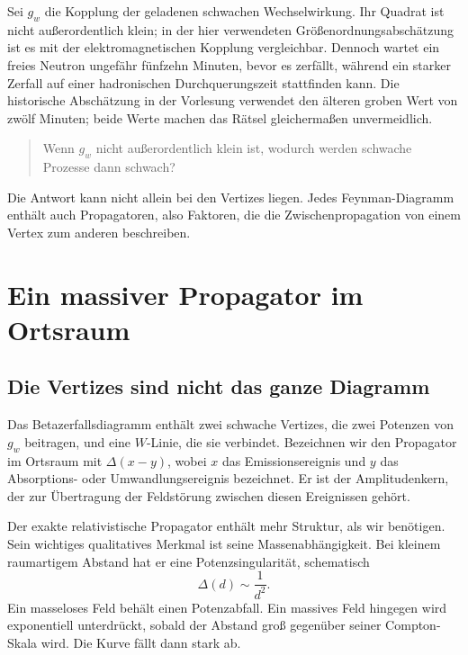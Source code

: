 Sei \(g_w\) die Kopplung der geladenen schwachen Wechselwirkung. Ihr Quadrat ist nicht außerordentlich klein; in der hier verwendeten Größenordnungsabschätzung ist es mit der elektromagnetischen Kopplung vergleichbar. Dennoch wartet ein freies Neutron ungefähr fünfzehn Minuten, bevor es zerfällt, während ein starker Zerfall auf einer hadronischen Durchquerungszeit stattfinden kann. Die historische Abschätzung in der Vorlesung verwendet den älteren groben Wert von zwölf Minuten; beide Werte machen das Rätsel gleichermaßen unvermeidlich.
\begin{quote}
Wenn \(g_w\) nicht außerordentlich klein ist, wodurch werden schwache Prozesse dann schwach?
\end{quote}

Die Antwort kann nicht allein bei den Vertizes liegen. Jedes Feynman-Diagramm enthält auch Propagatoren, also Faktoren, die die Zwischenpropagation von einem Vertex zum anderen beschreiben.

\section{Ein massiver Propagator im Ortsraum}

\subsection{Die Vertizes sind nicht das ganze Diagramm}

Das Betazerfallsdiagramm enthält zwei schwache Vertizes, die zwei Potenzen von \(g_w\) beitragen, und eine \(W\)-Linie, die sie verbindet. Bezeichnen wir den Propagator im Ortsraum mit \(\Delta(x-y)\), wobei \(x\) das Emissionsereignis und \(y\) das Absorptions- oder Umwandlungsereignis bezeichnet. Er ist der Amplitudenkern, der zur Übertragung der Feldstörung zwischen diesen Ereignissen gehört.

Der exakte relativistische Propagator enthält mehr Struktur, als wir benötigen. Sein wichtiges qualitatives Merkmal ist seine Massenabhängigkeit. Bei kleinem raumartigem Abstand hat er eine Potenzsingularität, schematisch
\begin{equation}
  \Delta(d)\sim\frac1{d^2}.
\end{equation}
Ein masseloses Feld behält einen Potenzabfall. Ein massives Feld hingegen wird exponentiell unterdrückt, sobald der Abstand groß gegenüber seiner Compton-Skala wird. Die Kurve fällt dann stark ab.

